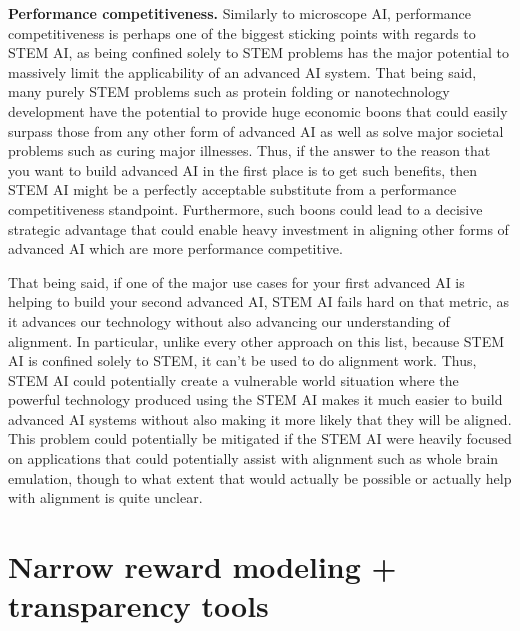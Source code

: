 \documentclass[
  onecolumn,
  natbib,
]{miri-tech-article}
\begin{document}
\textbf{Performance competitiveness.} Similarly to microscope AI, performance competitiveness is perhaps one of the biggest sticking points with regards to STEM AI, as being confined solely to STEM problems has the major potential to massively limit the applicability of an advanced AI system. That being said, many purely STEM problems such as protein folding\cite{TODO: cite https://en.wikipedia.org/wiki/Protein_folding} or nanotechnology development\cite{TODO: cite https://en.wikipedia.org/wiki/Molecular_nanotechnology} have the potential to provide huge economic boons that could easily surpass those from any other form of advanced AI as well as solve major societal problems such as curing major illnesses. Thus, if the answer to the reason that you want to build advanced AI in the first place is to get such benefits, then STEM AI might be a perfectly acceptable substitute from a performance competitiveness standpoint. Furthermore, such boons could lead to a decisive strategic advantage\cite{TODO: cite https://www.lesswrong.com/posts/vkjWGJrFWBnzHtxrw/superintelligence-7-decisive-strategic-advantage} that could enable heavy investment in aligning other forms of advanced AI which are more performance competitive.

That being said, if one of the major use cases for your first advanced AI is helping to build your second advanced AI, STEM AI fails hard on that metric, as it advances our technology without also advancing our understanding of alignment. In particular, unlike every other approach on this list, because STEM AI is confined solely to STEM, it can't be used to do alignment work. Thus, STEM AI could potentially create a vulnerable world\cite{TODO: cite https://nickbostrom.com/papers/vulnerable.pdf} situation where the powerful technology produced using the STEM AI makes it much easier to build advanced AI systems without also making it more likely that they will be aligned. This problem could potentially be mitigated if the STEM AI were heavily focused on applications that could potentially assist with alignment such as whole brain emulation\cite{TODO: cite https://www.fhi.ox.ac.uk/brain-emulation-roadmap-report.pdf}, though to what extent that would actually be possible or actually help with alignment is quite unclear.

\section{Narrow reward modeling + transparency tools}
\label{sec:7}
\end{document}
